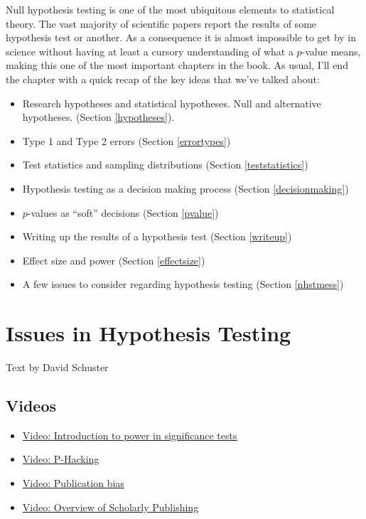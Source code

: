 \documentclass[
]{book}
\providecommand{\tightlist}{%
  \setlength{\itemsep}{0pt}\setlength{\parskip}{0pt}}
\begin{document}
Null hypothesis testing is one of the most ubiquitous elements to statistical theory. The vast majority of scientific papers report the results of some hypothesis test or another. As a consequence it is almost impossible to get by in science without having at least a cursory understanding of what a \(p\)-value means, making this one of the most important chapters in the book. As usual, I'll end the chapter with a quick recap of the key ideas that we've talked about:

\begin{itemize}
\tightlist
\item
  Research hypotheses and statistical hypotheses. Null and alternative hypotheses. (Section \ref{hypotheses}).
\item
  Type 1 and Type 2 errors (Section \ref{errortypes})
\item
  Test statistics and sampling distributions (Section \ref{teststatistics})
\item
  Hypothesis testing as a decision making process (Section \ref{decisionmaking})
\item
  \(p\)-values as ``soft'' decisions (Section \ref{pvalue})
\item
  Writing up the results of a hypothesis test (Section \ref{writeup})
\item
  Effect size and power (Section \ref{effectsize})
\item
  A few issues to consider regarding hypothesis testing (Section \ref{nhstmess})
\end{itemize}

\hypertarget{issues-in-hypothesis-testing}{%
\chapter{Issues in Hypothesis Testing}\label{issues-in-hypothesis-testing}}

Text by David Schuster

\hypertarget{videos-4}{%
\section{Videos}\label{videos-4}}

\begin{itemize}
\item
  \href{https://www.youtube.com/watch?v=6_Cuz0QqRWc}{Video: Introduction to power in significance tests}
\item
  \href{https://www.youtube.com/watch?v=FLNeWgs2n_Q}{Video: P-Hacking}
\item
  \href{https://www.youtube.com/watch?v=BenytbfaMMI}{Video: Publication bias}
\item
  \href{https://www.youtube.com/watch?v=IZUdd765nA4}{Video: Overview of Scholarly Publishing}
\end{itemize}
\end{document}
